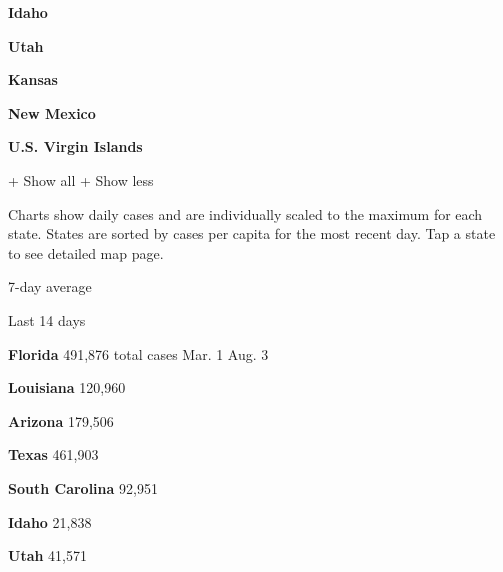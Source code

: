 \href{https://www.nytimes.com/interactive/2020/us/idaho-coronavirus-cases.html}{}

\textbf{Idaho}

\href{https://www.nytimes.com/interactive/2020/us/utah-coronavirus-cases.html}{}

\textbf{Utah}

\href{https://www.nytimes.com/interactive/2020/us/kansas-coronavirus-cases.html}{}

\textbf{Kansas}

\href{https://www.nytimes.com/interactive/2020/us/new-mexico-coronavirus-cases.html}{}

\textbf{New Mexico}

\textbf{U.S. Virgin Islands}

+ Show all + Show less

Charts show daily cases and are individually scaled to the maximum for
each state. States are sorted by cases per capita for the most recent
day. Tap a state to see detailed map page.

\href{https://www.nytimes.com/interactive/2020/us/florida-coronavirus-cases.html}{}

7-day average

Last 14 days

\textbf{Florida} 491,876 total cases Mar. 1 Aug. 3

\href{https://www.nytimes.com/interactive/2020/us/louisiana-coronavirus-cases.html}{}

\textbf{Louisiana} 120,960

\href{https://www.nytimes.com/interactive/2020/us/arizona-coronavirus-cases.html}{}

\textbf{Arizona} 179,506

\href{https://www.nytimes.com/interactive/2020/us/texas-coronavirus-cases.html}{}

\textbf{Texas} 461,903

\href{https://www.nytimes.com/interactive/2020/us/south-carolina-coronavirus-cases.html}{}

\textbf{South Carolina} 92,951

\href{https://www.nytimes.com/interactive/2020/us/idaho-coronavirus-cases.html}{}

\textbf{Idaho} 21,838

\href{https://www.nytimes.com/interactive/2020/us/utah-coronavirus-cases.html}{}

\textbf{Utah} 41,571

\href{https://www.nytimes.com/interactive/2020/us/kansas-coronavirus-cases.html}{}

